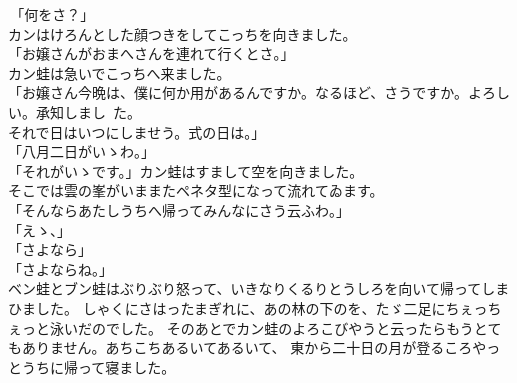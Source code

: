 \documentclass[
a4paper,
10pt,
book]
{tarticle}
\begin{document}
\newpage
\setcounter{page}{11}
\thispagestyle{fancy}
\begin{linenumbers}
    \noindent \,「何をさ？」\\
    \indent カンはけろんとした顔つきをしてこっちを向きました。\\
    「お嬢さんがおまへさんを連れて行くとさ。」\\
    \indent カン蛙は急いでこっちへ来ました。\\
    「お嬢さん今晩は、僕に何か用があるんですか。なるほど、さうですか。よろしい。承知しまし~た。\\
    \indent それで日はいつにしませう。式の日は。」\\
    「八月二日がいゝわ。」\\
    「それがいゝです。」カン蛙はすまして空を向きました。\\
    \indent そこでは雲の峯がいままたペネタ型になって流れてゐます。\\
    「そんならあたしうちへ帰ってみんなにさう云ふわ。」\\
    「えゝ、」\\
    「さよなら」\\
    「さよならね。」\\
    \indent ベン蛙とブン蛙はぶりぶり怒って、いきなりくるりとうしろを向いて帰ってしまひました。
    しゃくにさはったまぎれに、あの林の下のを、たゞ二足にちぇっちぇっと泳いだのでした。
    そのあとでカン蛙のよろこびやうと云ったらもうとてもありません。あちこちあるいてあるいて、
    東から二十日の月が登るころやっとうちに帰って寝ました。
\end{linenumbers}
\end{document}
